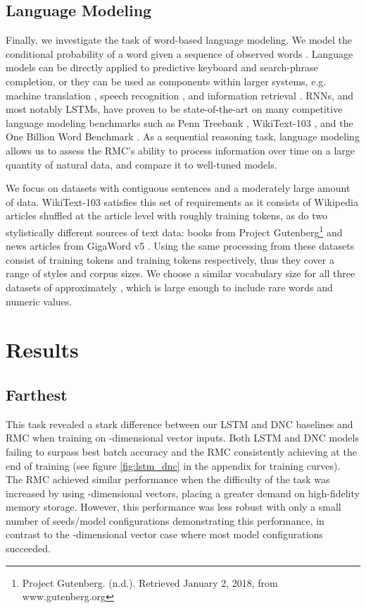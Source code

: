 \documentclass{article}
\begin{document}
\subsection{Language Modeling}
Finally, we investigate the task of word-based language modeling. We model the conditional probability  of a word  given a sequence of observed words . Language models can be directly applied to predictive keyboard and search-phrase completion, or they can be used as components within larger systems, e.g. machine translation \cite{cho2014learning}, speech recognition \cite{bahdanau2016end}, and information retrieval \cite{hiemstra2001using}.  RNNs, and most notably LSTMs, have proven to be state-of-the-art on many competitive language modeling benchmarks such as Penn Treebank \cite{yang2017breaking, marcus1993building}, WikiText-103 \cite{rae2018fast, merity2016pointer}, and the One Billion Word Benchmark \cite{jozefowicz2016exploring, chelba2013one}. As a sequential reasoning task, language modeling allows us to assess the RMC's ability to process information over time on a large quantity of natural data, and compare it to well-tuned models. 

We focus on datasets with contiguous sentences and a moderately large amount of data. WikiText-103 satisfies this set of requirements as it consists of Wikipedia articles shuffled at the article level with roughly  training tokens, as do two stylistically different sources of text data: books from Project Gutenberg\footnote{Project Gutenberg. (n.d.). Retrieved January 2, 2018, from www.gutenberg.org} and news articles from GigaWord v5 \cite{parker2011english}. Using the same processing from \cite{rae2018fast} these datasets consist of  training tokens and  training tokens respectively, thus they cover a range of styles and corpus sizes. We choose a similar vocabulary size for all three datasets of approximately , which is large enough to include rare words and numeric values. \section{Results}

\subsection{ Farthest}
This task revealed a stark difference between our LSTM and DNC baselines and RMC when training on -dimensional vector inputs. Both LSTM and DNC models failing to surpass  best batch accuracy and the RMC consistently achieving  at the end of training (see figure \ref{fig:lstm_dnc} in the appendix for training curves). The RMC achieved similar performance when the difficulty of the task was increased by using -dimensional vectors, placing a greater demand on high-fidelity memory storage. However, this performance was less robust with only a small number of seeds/model configurations demonstrating this performance, in contrast to the -dimensional vector case where most model configurations succeeded. 
\end{document}
